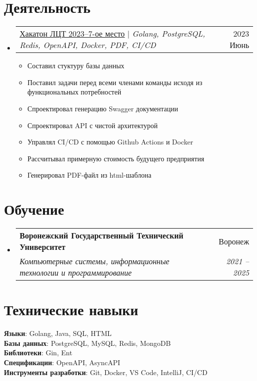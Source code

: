 \documentclass[letterpaper,11pt]{article}
\makeatletter
\newcommand{\resumeItem}[1]{
  \item\small{
    {#1 \vspace{-2pt}}
  }
}
\newcommand{\resumeSubheading}[4]{
  \vspace{-2pt}\item
    \begin{tabular*}{0.97\textwidth}[t]{l@{\extracolsep{\fill}}r}
      \textbf{#1} & #2 \\
      \textit{\small#3} & \textit{\small #4} \\
    \end{tabular*}\vspace{-7pt}
}
\newcommand{\resumeProjectHeading}[2]{
    \item
    \begin{tabular*}{0.97\textwidth}{l@{\extracolsep{\fill}}r}
      \small#1 & #2 \\
    \end{tabular*}\vspace{-7pt}
}
\newcommand{\resumeSubHeadingListStart}{\begin{itemize}[leftmargin=0.15in, label={}]}
\newcommand{\resumeSubHeadingListEnd}{\end{itemize}}
\newcommand{\resumeItemListStart}{\begin{itemize}}
\newcommand{\resumeItemListEnd}{\end{itemize}\vspace{-5pt}}
\makeatother
\begin{document}
\section{Деятельность}
\resumeSubHeadingListStart
\resumeProjectHeading
{\href{https://github.com/wtkeqrf0/CV/blob/main/Leaders_Digital_Transformations_2023.pdf}{\underline{Хакатон ЛЦТ 2023--7-ое место}} $|$ \emph{Golang, PostgreSQL, Redis, OpenAPI, Docker, PDF, CI/CD}}{2023 Июнь}
\resumeItemListStart
\resumeItem{Составил стуктуру базы данных}
\resumeItem{Поставил задачи перед всеми членами команды исходя из функциональных потребностей}
\resumeItem{Спроектировал генерацию Swagger документации}
\resumeItem{Спроектировал API с чистой архитектурой}
\resumeItem{Управлял CI/CD с помощью Github Actions и Docker}
\resumeItem{Рассчитывал примерную стоимость будущего предприятия}
\resumeItem{Генерировал PDF-файл из html-шаблона}
\resumeItemListEnd
\resumeSubHeadingListEnd

\section{Обучение}
\resumeSubHeadingListStart
\resumeSubheading
{Воронежский Государственный Технический Университет}{Воронеж}
{Компьютерные системы, информационные технологии и программирование}{2021 -- 2025}
\resumeSubHeadingListEnd

\section{Технические навыки}
\begin{itemize}[leftmargin=0.15in, label={}]
	\small{\item{
		\textbf{Языки}{: Golang, Java, SQL, HTML} \\
		\textbf{Базы данных}{: PostgreSQL, MySQL, Redis, MongoDB} \\
		\textbf{Библиотеки}{: Gin, Ent} \\
		\textbf{Спецификации}{: OpenAPI, AsyncAPI} \\
		\textbf{Инструменты разработки}{: Git, Docker, VS Code, IntelliJ, CI/CD} \\
	}}
\end{itemize}

\end{document}
